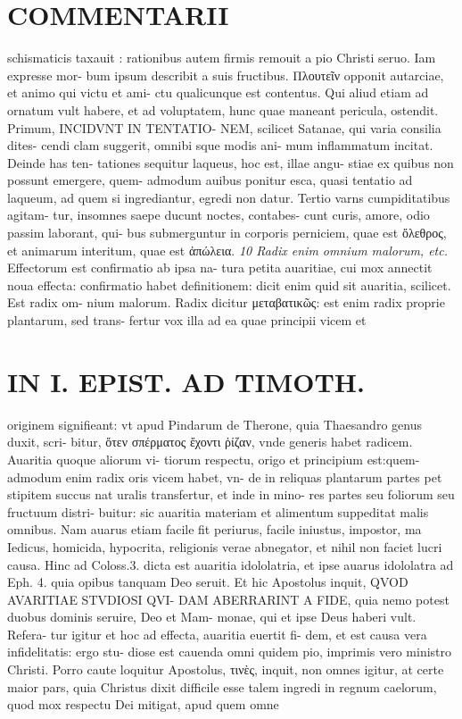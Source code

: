 \documentclass{article}
\begin{document}
\begin{pages}
\section*{COMMENTARII }
\marginpar{[ p.156 ]}\pstart schismaticis taxauit : rationibus autem firmis remouit a pio Christi seruo. Iam expresse mor- bum ipsum describit a suis fructibus. Πλουτεῖν opponit autarciae, et animo qui victu et ami- ctu qualicunque est contentus. Qui aliud etiam ad ornatum vult habere, et ad voluptatem, hunc quae maneant pericula, ostendit.  \pend\pstart Primum, INCIDVNT IN TENTATIO- NEM, scilicet Satanae, qui varia consilia dites- cendi clam suggerit, omnibi sque modis ani- mum inflammatum incitat. Deinde has ten- tationes sequitur laqueus, hoc est, illae angu- stiae ex quibus non possunt emergere, quem- admodum auibus ponitur esca, quasi tentatio ad laqueum, ad quem si ingrediantur, egredi non datur. Tertio varns cumpiditatibus agitam- tur, insomnes saepe ducunt noctes, contabes- cunt curis, amore, odio passim laborant, qui- bus submerguntur in corporis perniciem, quae est ὄλεθρος, et animarum interitum, quae est ἀπώλεια.  \pend
\textit{10 Radix enim omnium malorum, etc. }\pstart Effectorum est confirmatio ab ipsa na- tura petita auaritiae, cui mox annectit noua effecta: confirmatio habet definitionem: dicit enim quid sit auaritia, scilicet. Est radix om- nium malorum. Radix dicitur μεταβατικῶς: est enim radix proprie plantarum, sed trans- fertur vox illa ad ea quae principii vicem et  \pend
\section*{IN I. EPIST. AD TIMOTH. }
\marginpar{[ p.157 ]}\pstart originem signifieant: vt apud Pindarum de Therone, quia Thaesandro genus duxit, scri- bitur, ὅτεν σπέρματος ἔχοντι ῥίζαν, vnde generis habet radicem. Auaritia quoque aliorum vi- tiorum respectu, origo et principium est:quem- admodum enim radix oris vicem habet, vn- de in reliquas plantarum partes pet stipitem succus nat uralis transfertur, et inde in mino- res partes seu foliorum seu fructuum distri- buitur: sic auaritia materiam et alimentum suppeditat malis omnibus. Nam auarus etiam facile fit periurus, facile iniustus, impostor, ma Iedicus, homicida, hypocrita, religionis verae abnegator, et nihil non faciet lucri causa. Hinc ad Coloss.3. dicta est auaritia idololatria, et ipse auarus idololatra ad Eph. 4. quia opibus tanquam Deo seruit. Et hic Apostolus inquit, QVOD AVARITIAE STVDIOSI QVI- DAM ABERRARINT A FIDE, quia nemo potest duobus dominis seruire, Deo et Mam- monae, qui et ipse Deus haberi vult. Refera- tur igitur et hoc ad effecta, auaritia euertit fi- dem, et est causa vera infidelitatis: ergo stu- diose est cauenda omni quidem pio, imprimis vero ministro Christi. Porro caute loquitur Apostolus, τινὲς, inquit, non omnes igitur, at certe maior pars, quia Christus dixit difficile esse talem ingredi in regnum caelorum, quod mox respectu Dei mitigat, apud quem omne  \pend

\end{pages}
\end{document}
